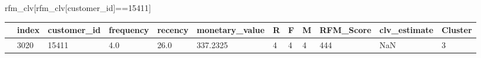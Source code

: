 \documentclass[
]{ctexart}
\newenvironment{Shaded}{\begin{snugshade}}{\end{snugshade}}
\newcommand{\DecValTok}[1]{\textcolor[rgb]{0.68,0.00,0.00}{#1}}
\newcommand{\NormalTok}[1]{\textcolor[rgb]{0.00,0.23,0.31}{#1}}
\newcommand{\OperatorTok}[1]{\textcolor[rgb]{0.37,0.37,0.37}{#1}}
\newcommand{\StringTok}[1]{\textcolor[rgb]{0.13,0.47,0.30}{#1}}
\newcounter{none} %
\begin{document}
\begin{Shaded}
\begin{Highlighting}[]
\NormalTok{rfm\_clv[rfm\_clv[}\StringTok{\textquotesingle{}customer\_id\textquotesingle{}}\NormalTok{]}\OperatorTok{==}\DecValTok{15411}\NormalTok{]}
\end{Highlighting}
\end{Shaded}

{\def\LTcaptype{none} %
\begin{longtable}[]{@{}llllllllllll@{}}
\toprule\noalign{}
& index & customer\_id & frequency & recency & monetary\_value & R & F &
M & RFM\_Score & clv\_estimate & Cluster \\
\midrule\noalign{}
\endhead
\bottomrule\noalign{}
\endlastfoot
3020 & 3020 & 15411 & 4.0 & 26.0 & 337.2325 & 4 & 4 & 4 & 444 & NaN &
3 \\
\end{longtable}
}
\end{document}
